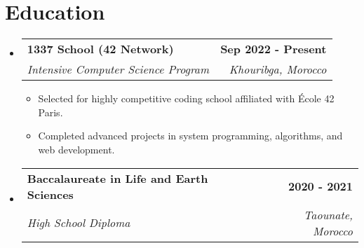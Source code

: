 \documentclass[11pt,a4paper]{article}
\makeatletter
\newcommand{\resumeItem}[1]{
  \item\small{
    {#1 \vspace{-2pt}}
  }
}
\newcommand{\resumeSubheading}[4]{
  \vspace{-2pt}\item
    \begin{tabular*}{0.97\textwidth}[t]{l@{\extracolsep{\fill}}r}
      \textbf{\color{linkcolor}#1} & \textbf{#2} \\
      \textit{\small#3} & \textit{\small #4} \\
    \end{tabular*}\vspace{-7pt}
}
\newcommand{\resumeSubHeadingListStart}{\begin{itemize}[leftmargin=0.15in, label={}]}
\newcommand{\resumeSubHeadingListEnd}{\end{itemize}}
\newcommand{\resumeItemListStart}{\begin{itemize}}
\newcommand{\resumeItemListEnd}{\end{itemize}\vspace{-5pt}}
\makeatother
\begin{document}
\section{Education}
\resumeSubHeadingListStart

\resumeSubheading
{1337 School (42 Network)}{Sep 2022 - Present}
{Intensive Computer Science Program}{Khouribga, Morocco}
\resumeItemListStart
\resumeItem{Selected for highly competitive coding school affiliated with École 42 Paris.}
\resumeItem{Completed advanced projects in system programming, algorithms, and web development.}
\resumeItemListEnd

\resumeSubheading
{Baccalaureate in Life and Earth Sciences}{2020 - 2021}
{High School Diploma}{Taounate, Morocco}

\resumeSubHeadingListEnd
\end{document}
